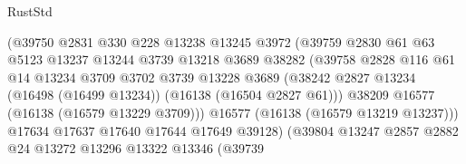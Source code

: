 \begin{lexlean}{RustStd}
\begin{coremodule}
                                    (@39750
                                      @2831
                                      @330
                                      @228
                                      @13238
                                      @13245
                                      @3972
                                      (@39759
                                        @2830
                                        @61
                                        @63
                                        @5123
                                        @13237
                                        @13244
                                        @3739
                                        @13218
                                        @3689
                                        @38282
                                        (@39758
                                          @2828
                                          @116
                                          @61
                                          @14
                                          @13234
                                          @3709
                                          @3702
                                          @3739
                                          @13228
                                          @3689
                                          (@38242
                                            @2827
                                            @13234
                                            (@16498 (@16499 @13234))
                                            (@16138 (@16504 @2827 @61)))
                                          @38209
                                          @16577
                                          (@16138 (@16579 @13229 @3709)))
                                        @16577
                                        (@16138 (@16579 @13219 @13237)))
                                      @17634
                                      @17637
                                      @17640
                                      @17644
                                      @17649
                                      @39128)
                                    (@39804
                                      @13247
                                      @2857
                                      @2882
                                      @24
                                      @13272
                                      @13296
                                      @13322
                                      @13346
                                      (@39739

\end{coremodule}
\end{lexlean}
